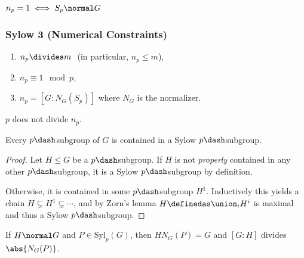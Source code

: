 \begin{corollary}

\(n_p = 1 \iff S_p \normal G\)

\end{corollary}

\hypertarget{sylow-3-numerical-constraints}{%
\subsubsection{Sylow 3 (Numerical
Constraints)}\label{sylow-3-numerical-constraints}}

\begin{enumerate}
\def\labelenumi{\arabic{enumi}.}
\item
  \(n_p \divides m~\) (in particular, \(n_p \leq m\)),
\item
  \(n_p \equiv 1 \mod p\),
\item
  \(n_p = [G : N_G(S_p)]\) where \(N_G\) is the normalizer.
\end{enumerate}

\begin{corollary}

\(p\) does not divide \(n_p\).

\end{corollary}

\begin{proposition}

Every \(p\dash\)subgroup of \(G\) is contained in a Sylow
\(p\dash\)subgroup.

\end{proposition}

\begin{proof}

Let \(H \leq G\) be a \(p\dash\)subgroup. If \(H\) is not
\emph{properly} contained in any other \(p\dash\)subgroup, it is a Sylow
\(p\dash\)subgroup by definition.

Otherwise, it is contained in some \(p\dash\)subgroup \(H^1\).
Inductively this yields a chain \(H \subsetneq H^1 \subsetneq \cdots\),
and by Zorn's lemma \(H\definedas \union_i H^i\) is maximal and thus a
Sylow \(p\dash\)subgroup.

\end{proof}

\begin{theorem}

If \(H\normal G\) and \(P \in \mathrm{Syl}_p(G)\), then \(H N_G(P) = G\)
and \([G: H]\) divides \(\abs{N_G(P)}\).

\end{theorem}

